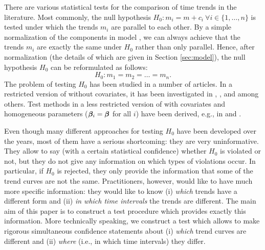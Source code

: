 \documentclass[12pt]{article}
\makeatletter
\renewcommand{\eqref}[1]{\tagform@{\ref{#1}}}
\makeatother
\begin{document}
There are various statistical tests for the comparison of time trends in the literature. Most commonly, the null hypothesis $H_0: m_i = m + c_i \ \forall i \in \{1,\ldots,n\}$ is tested under which the trends $m_i$ are parallel to each other. By a simple normalization of the components in model \eqref{eq:model_full}, we can always achieve that the trends $m_i$ are exactly the same under $H_0$ rather than only parallel. Hence, after normalization (the details of which are given in Section \ref{sec:model}), the null hypothesis $H_0$ can be reformulated as follows: 
\[ H_0: m_1 = m_2 = \ldots = m_n. \]   
The problem of testing $H_0$ has been studied in a number of articles. In a restricted version of \eqref{eq:model_full} without covariates, it has been investigated in \cite{HaerdleMarron1990}, \cite{Hall1990}, \cite{DegrasWu2012} and \cite{ChenWu2018} among others. Test methods in a less restricted version of \eqref{eq:model_full} with covariates and homogeneous parameters ($\bm{\beta}_i = \bm{\beta}$ for all $i$) have been derived, e.g., in \cite{Zhang2012} and \cite{Hidalgo2014}.


Even though many different approaches for testing $H_0$ have been developed over the years, most of them have a serious shortcoming: they are very uninformative. They allow to say (with a certain statistical confidence) whether $H_0$ is violated or not, but they do not give any information on which types of violations occur. In particular, if $H_0$ is rejected, they only provide the information that some of the trend curves are not the same. Practitioners, however, would like to have much more specific information: they would like to know (i) \textit{which} trends have a different form and (ii) \textit{in which time intervals} the trends are different. The main aim of this paper is to construct a test procedure which provides exactly this information. More technically speaking, we construct a test which allows to make rigorous simultaneous confidence statements about (i) \textit{which} trend curves are different and (ii) \textit{where} (i.e., in which time intervals) they differ. 
\end{document}
